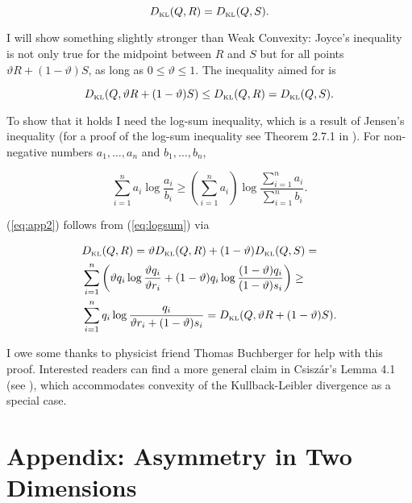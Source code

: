 \documentclass[11pt]{article}
\begin{document}
\begin{equation}
  \label{eq:app1}
  D_{\mbox{\tiny KL}}(Q,R)=D_{\mbox{\tiny KL}}(Q,S).
\end{equation}

I will show something slightly stronger than Weak Convexity: Joyce's
inequality is not only true for the midpoint between $R$ and $S$ but
for all points $\vartheta{}R+(1-\vartheta)S$, as long as
$0\leq\vartheta\leq{}1$. The inequality aimed for is

\begin{equation}
  \label{eq:app2}
  D_{\mbox{\tiny KL}}(Q,\vartheta{}R+(1-\vartheta)S)\leq{}D_{\mbox{\tiny KL}}(Q,R)=D_{\mbox{\tiny KL}}(Q,S).
\end{equation}

To show that it holds I need the log-sum inequality, which is a result
of Jensen's inequality (for a proof of the log-sum inequality see
Theorem 2.7.1 in ). For non-negative
numbers $a_{1},\ldots,a_{n}$ and $b_{1},\ldots,b_{n}$,

\begin{equation}
  \label{eq:logsum}
  \sum_{i=1}^{n}a_{i}\log\frac{a_{i}}{b_{i}}\geq\left(\sum_{i=1}^{n}a_{i}\right)\log\frac{\sum_{i=1}^{n}a_{i}}{\sum_{i=1}^{n}b_{i}}.
\end{equation}

(\ref{eq:app2}) follows from (\ref{eq:logsum}) via

\begin{align}
  \label{eq:app3}
  &D_{\mbox{\tiny KL}}(Q,R)=\vartheta{}D_{\mbox{\tiny KL}}(Q,R)+(1-\vartheta)D_{\mbox{\tiny KL}}(Q,S)=\notag \\
  &\sum_{i=1}^{n}\left(\vartheta{}q_{i}\log\frac{\vartheta{}q_{i}}{\vartheta{}r_{i}}+(1-\vartheta)q_{i}\log\frac{(1-\vartheta)q_{i}}{(1-\vartheta)s_{i}}\right)\geq\notag \\
  &\sum_{i=1}^{n}q_{i}\log\frac{q_{i}}{\vartheta{}r_{i}+(1-\vartheta)s_{i}}=D_{\mbox{\tiny KL}}(Q,\vartheta{}R+(1-\vartheta)S).
\end{align}

I owe some thanks to physicist friend Thomas Buchberger for help with
this proof. Interested readers can find a more general claim in
Csisz{\'a}r's Lemma 4.1 (see ), which
accommodates convexity of the Kullback-Leibler divergence as a special
case.

\section{Appendix: Asymmetry in Two Dimensions}
\label{app:asytwodims}
\end{document}
